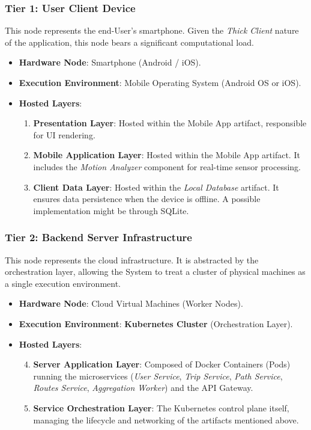 \subsubsection*{Tier 1: User Client Device}
This node represents the end-User's smartphone. Given the \emph{Thick Client} nature of the application, this node bears a significant computational load.
\begin{itemize}
    \item \textbf{Hardware Node}: Smartphone (Android / iOS).
    \item \textbf{Execution Environment}: Mobile Operating System (Android OS or iOS).
    \item \textbf{Hosted Layers}:
    \begin{enumerate}
        \item \textbf{Presentation Layer}: Hosted within the Mobile App artifact, responsible for UI rendering.
        \item \textbf{Mobile Application Layer}: Hosted within the Mobile App artifact. It includes the \emph{Motion Analyzer} component for real-time sensor processing.
        \item \textbf{Client Data Layer}: Hosted within the \emph{Local Database} artifact. It ensures data persistence when the device is offline. A possible implementation might be through SQLite.
    \end{enumerate}
\end{itemize}

\subsubsection*{Tier 2: Backend Server Infrastructure}
This node represents the cloud infrastructure. It is abstracted by the orchestration layer, allowing the System to treat a cluster of physical machines as a single execution environment.
\begin{itemize}
    \item \textbf{Hardware Node}: Cloud Virtual Machines (Worker Nodes).
    \item \textbf{Execution Environment}: \textbf{Kubernetes Cluster} (Orchestration Layer).
    \item \textbf{Hosted Layers}:
    \begin{enumerate}
        \setcounter{enumi}{3} 
        \item \textbf{Server Application Layer}: Composed of Docker Containers (Pods) running the microservices (\emph{User Service}, \emph{Trip Service}, \emph{Path Service}, \emph{Routes Service}, \emph{Aggregation Worker}) and the API Gateway.
        \item \textbf{Service Orchestration Layer}: The Kubernetes control plane itself, managing the lifecycle and networking of the artifacts mentioned above.
    \end{enumerate}
\end{itemize}

